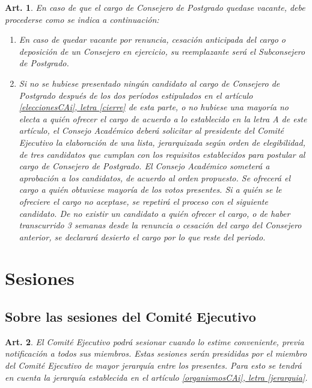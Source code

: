 \documentclass[letterpaper,11pt]{article}
\theoremstyle{plain}
\newtheorem{art}{Art.} %
\newcommand{\aaref}[2]{\hyperref[#2]{\ref*{#1}, letra \ref*{#2}}}
\begin{document}
		\begin{art} \label{eleccionExtraordinariaCAPostgrado}
			En caso de que el cargo de Consejero de Postgrado quedase vacante, debe procederse como se indica a continuación:
			\begin{enumerate}
				\item\label{cp_renuncia} En caso de quedar vacante por renuncia, cesación anticipada del cargo o deposición de un Consejero en ejercicio, su reemplazante será el Subconsejero de Postgrado.
				
				\item Si no se hubiese presentado ningún candidato al cargo de Consejero de Postgrado después de los dos períodos estipulados en el artículo \aaref{eleccionesCAi}{cierre} de esta parte, o no hubiese una mayoría no electa a quién ofrecer el cargo de acuerdo a lo establecido en la letra A de este artículo, el Consejo Académico deberá solicitar al presidente del Comité Ejecutivo la elaboración de una lista, jerarquizada según orden de elegibilidad, de tres candidatos que cumplan con los requisitos establecidos para postular al cargo de Consejero de Postgrado. El Consejo Académico someterá a aprobación a los candidatos, de acuerdo al orden propuesto. Se ofrecerá el cargo a quién obtuviese mayoría de los votos presentes. Si a quién se le ofreciere el cargo no aceptase, se repetirá el proceso con el siguiente candidato. De no existir un candidato a quién ofrecer el cargo, o de haber transcurrido 3 semanas desde la renuncia o cesación del cargo del Consejero anterior, se declarará desierto el cargo por lo que reste del periodo.
			\end{enumerate}
		\end{art}

	\section{Sesiones}\label{sesiones}

		\subsection*{Sobre las sesiones del Comité Ejecutivo}

			\begin{art} \label{sesionesEjecutivo}
				El Comité Ejecutivo podrá sesionar cuando lo estime conveniente, previa notificación a todos sus miembros. Estas sesiones serán presididas por el miembro del Comité Ejecutivo de mayor jerarquía entre los presentes. Para esto se tendrá en cuenta la jerarquía establecida en el artículo  \aaref{organismosCAi}{jerarquia}.
			\end{art}
\end{document}

